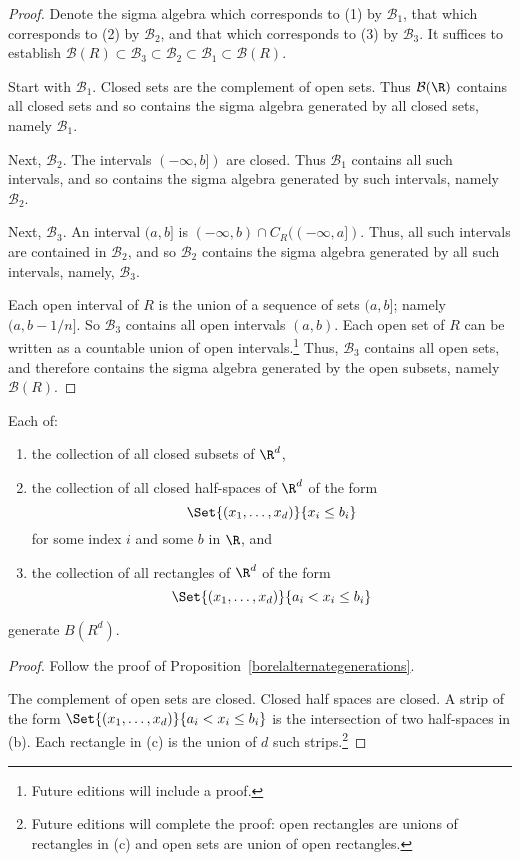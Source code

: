 \begin{proof}Denote the sigma algebra which corresponds to (1) by $\mathcal{B} _1$, that which corresponds to (2) by $\mathcal{B} _2$, and that which corresponds to (3) by $\mathcal{B} _3$.
It suffices to establish $\mathcal{B} (R) \subset \mathcal{B} _3 \subset \mathcal{B} _2 \subset \mathcal{B} _1 \subset \mathcal{B} (R)$.

Start with $\mathcal{B} _1$.
Closed sets are the complement of open sets.
Thus $\mathcal{B} (\R )$ contains all closed sets and so contains the sigma algebra generated by all closed sets, namely $\mathcal{B} _1$.

Next, $\mathcal{B} _2$.
The intervals $(-\infty, b])$ are closed.
Thus $\mathcal{B} _1$ contains all such intervals, and so contains the sigma algebra generated by such intervals, namely $\mathcal{B} _2$.

Next, $\mathcal{B} _3$.
An interval $(a, b]$ is $(-\infty, b) \cap  C_R((-\infty, a])$.
Thus, all such intervals are contained in $\mathcal{B} _2$, and so $\mathcal{B} _2$ contains the sigma algebra generated by all such intervals, namely, $\mathcal{B} _3$.

Each open interval of $R$ is the union of a sequence of sets $(a, b]$; namely $(a, b-1/n]$.
So $\mathcal{B} _3$ contains all open intervals $(a, b)$.
Each open set of $R$ can be written as a countable union of open intervals.\footnote{Future editions will include a proof.}
Thus, $\mathcal{B} _3$ contains all open sets, and therefore contains the sigma algebra generated by the open subsets, namely $\mathcal{B} (R)$.
\end{proof}
\begin{proposition}
Each of:
  \begin{enumerate}
    \item the collection of all closed subsets of $\R^d$,
    \item the collection of all closed half-spaces of $\R^d$ of the form
\[
\Set{(x_1, \dots , x_d)}{x_i \leq b_i}
\]
for some index $i$ and some $b$ in $\R$, and
    \item the collection of all rectangles of $\R^d$ of the form
\[
\Set{(x_1, \dots , x_d)}{a_i < x_i \leq b_i}
\]
  \end{enumerate}
generate $B(R^d)$.
\end{proposition}

\begin{proof}Follow the proof of Proposition~\ref{borelalternategenerations}.

The complement of open sets are closed.
Closed half spaces are closed.
A strip of the form $\Set{(x_1, \dots , x_d)}{a_i < x_i \leq b_i}$ is the intersection of two half-spaces in (b).
Each rectangle in (c) is the union of $d$ such strips.\footnote{Future editions will complete the proof:
open rectangles are unions of
rectangles in (c) and
open sets are union of open rectangles.}
\end{proof}
